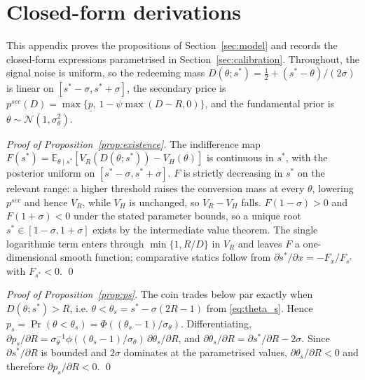 \section{Closed-form derivations}\label{app:proofs}\label{app:formal_model}

This appendix proves the propositions of Section~\ref{sec:model} and records the closed-form expressions parametrised in Section~\ref{sec:calibration}. Throughout, the signal noise is uniform, so the redeeming mass $D(\theta;s^*) = \tfrac12 + (s^*-\theta)/(2\sigma)$ is linear on $[s^*-\sigma, s^*+\sigma]$, the secondary price is $p^{sec}(D) = \max\{\underline p,\, 1-\psi\max(D-R,0)\}$, and the fundamental prior is $\theta \sim \mathcal{N}(1,\sigma_\theta^2)$.

\begin{proof}[Proof of Proposition~\ref{prop:existence}]
The indifference map $F(s^*) = \mathbb{E}_{\theta\mid s^*}[V_R(D(\theta;s^*)) - V_H(\theta)]$ is continuous in $s^*$, with the posterior uniform on $[s^*-\sigma,s^*+\sigma]$. $F$ is strictly decreasing in $s^*$ on the relevant range: a higher threshold raises the conversion mass at every $\theta$, lowering $p^{sec}$ and hence $V_R$, while $V_H$ is unchanged, so $V_R - V_H$ falls. $F(1-\sigma) > 0$ and $F(1+\sigma) < 0$ under the stated parameter bounds, so a unique root $s^*\in[1-\sigma,1+\sigma]$ exists by the intermediate value theorem. The single logarithmic term enters through $\min\{1, R/D\}$ in $V_R$ and leaves $F$ a one-dimensional smooth function; comparative statics follow from $\partial s^*/\partial x = -F_x/F_{s^*}$ with $F_{s^*}<0$. \qed
\end{proof}

\begin{proof}[Proof of Proposition~\ref{prop:ps}]
The coin trades below par exactly when $D(\theta;s^*) > R$, i.e. $\theta < \theta_s = s^* - \sigma(2R-1)$ from \eqref{eq:theta_s}. Hence $p_s = \Pr(\theta<\theta_s) = \Phi((\theta_s-1)/\sigma_\theta)$. Differentiating, $\partial p_s/\partial R = \sigma_\theta^{-1}\phi((\theta_s-1)/\sigma_\theta)\,\partial\theta_s/\partial R$, and $\partial\theta_s/\partial R = \partial s^*/\partial R - 2\sigma$. Since $\partial s^*/\partial R$ is bounded and $2\sigma$ dominates at the parametrised values, $\partial\theta_s/\partial R < 0$ and therefore $\partial p_s/\partial R < 0$. \qed
\end{proof}

